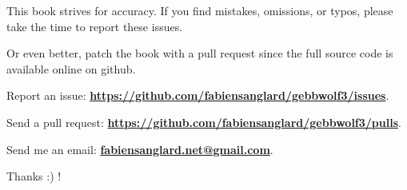 This book strives for accuracy. If you find mistakes, omissions, or typos, please take the time to report these issues.\\ 
\par
Or even better, patch the book with a pull request since the full source code is available online on github.\\
\par
Report an issue: \textbf{\href{https://github.com/fabiensanglard/gebbwolf3/issues}{https://github.com/fabiensanglard/gebbwolf3/issues}}.\\
\par
Send a pull request: \textbf{\href{https://github.com/fabiensanglard/gebbwolf3/pulls}{https://github.com/fabiensanglard/gebbwolf3/pulls}}.\\
\par
Send me an email: \textbf{\href{mailto:fabiensanglard.net@gmail.com}{fabiensanglard.net@gmail.com}}.\\
\par
Thanks :) !\\
